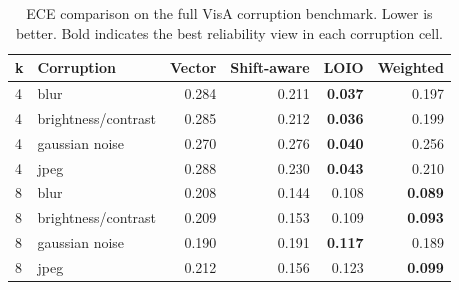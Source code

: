 \begin{table}[t]
\centering
\caption{ECE comparison on the full VisA corruption benchmark. Lower is better. Bold indicates the best reliability view in each corruption cell.}
\label{tab:visa-ece-corruption}
\footnotesize
\begin{tabular}{llrrrr}
\toprule
k & Corruption & Vector & Shift-aware & LOIO & Weighted \\
\midrule
4 & blur & 0.284 & 0.211 & \textbf{0.037} & 0.197 \\
4 & brightness/contrast & 0.285 & 0.212 & \textbf{0.036} & 0.199 \\
4 & gaussian noise & 0.270 & 0.276 & \textbf{0.040} & 0.256 \\
4 & jpeg & 0.288 & 0.230 & \textbf{0.043} & 0.210 \\
8 & blur & 0.208 & 0.144 & 0.108 & \textbf{0.089} \\
8 & brightness/contrast & 0.209 & 0.153 & 0.109 & \textbf{0.093} \\
8 & gaussian noise & 0.190 & 0.191 & \textbf{0.117} & 0.189 \\
8 & jpeg & 0.212 & 0.156 & 0.123 & \textbf{0.099} \\
\bottomrule
\end{tabular}
\end{table}
